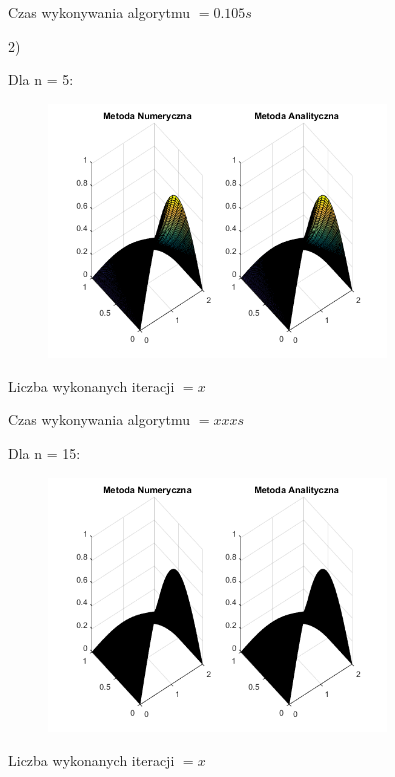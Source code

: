 Czas wykonywania algorytmu $ = 0.105 s$

2)

Dla n = 5:

\begin{figure}[!ht]
	\begin{center}
		\includegraphics[width=0.8\textwidth]{Lab7/charts/rmb/20.png}
	\end{center}
\end{figure}

Liczba wykonanych iteracji $ = x $

Czas wykonywania algorytmu $ = xxx s$

Dla n = 15:

\begin{figure}[!ht]
	\begin{center}
		\includegraphics[width=0.8\textwidth]{Lab7/charts/rmb/50.png}
	\end{center}
\end{figure}

Liczba wykonanych iteracji $ = x $

